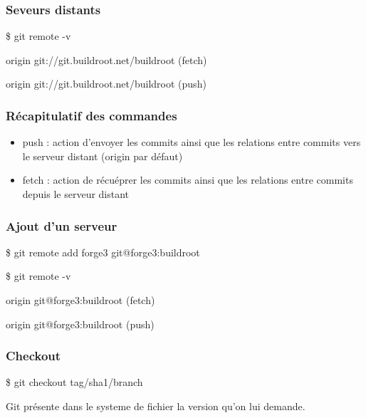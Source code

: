 \documentclass{beamer}
\begin{document}
\begin{frame}
  \frametitle{Seveurs distants}
  \begin{semiverbatim}
    \$ git remote -v

    origin git://git.buildroot.net/buildroot (fetch)

    origin git://git.buildroot.net/buildroot (push)
  \end{semiverbatim}
\end{frame}

\begin{frame}
  \frametitle{Récapitulatif des commandes}
  \begin{itemize}
  \item push : action d'envoyer les commits ainsi que les relations entre commits vers le serveur distant (origin par défaut)
  \item fetch : action de récuéprer les commits ainsi que les relations entre commits depuis le serveur distant
  \end{itemize}
\end{frame}

\begin{frame}
  \frametitle{Ajout d'un serveur}
  \begin{semiverbatim}
    \$ git remote add forge3 git@forge3:buildroot

    \$ git remote -v

    origin git@forge3:buildroot (fetch)

    origin git@forge3:buildroot (push)

  \end{semiverbatim}
\end{frame}

\begin{frame}
  \frametitle{Checkout}
  \begin{semiverbatim}
    \$ git checkout tag/sha1/branch
    
    Git présente dans le systeme de fichier la version qu'on lui demande.
  \end{semiverbatim}
\end{frame}
\end{document}
